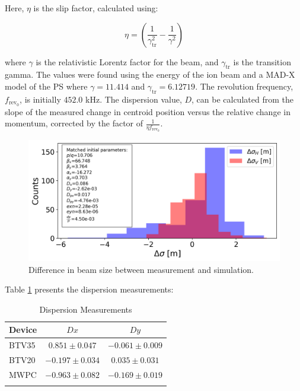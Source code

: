 \documentclass[a4paper,
               biblatex,     %
               ]{jacow}
\begin{document}
Here, $\eta$ is the slip factor, calculated using:

\begin{equation}
\eta = \left(\frac{1}{\gamma_{\text{tr}}^{2}} - \frac{1}{\gamma^{2}}\right)
\end{equation}

where $\gamma$ is the relativistic Lorentz factor for the beam, and $\gamma_{\text{tr}}$ is the transition gamma. The values were found using the energy of the ion beam and a MAD-X model of the PS where $\gamma = 11.414$ and $\gamma_{\text{tr}} = 6.12719$. The revolution frequency, $f_{\text{rev}_0}$, is initially $452.0$ kHz. The dispersion value, $D$, can be calculated from the slope of the measured change in centroid position versus the relative change in momentum, corrected by the factor of $\frac{1}{\eta f_{\text{rev}_0}}$.

\begin{figure}[!htb]
   \centering
   \includegraphics*[width=1.0\columnwidth]{beam_size_diff.png}
   \caption{Difference in beam size between measurement and simulation.}
   \label{fig:diff_beam_size}
\end{figure}

Table \ref{tab:dispersion} presents the dispersion measurements:

\begin{table}[h!]
\centering
\caption{Dispersion Measurements}
\begin{tabular}{l c c}
\hline
Device & \(Dx\) & \(Dy\) \\
\hline
BTV35  & \(0.851 \pm 0.047\) & \(-0.061 \pm 0.009\) \\
BTV20  & \(-0.197 \pm 0.034\) & \(0.035 \pm 0.031\) \\
MWPC   & \(-0.963 \pm 0.082\) & \(-0.169 \pm 0.019\) \\
\hline
\label{tab:dispersion}
\end{tabular}
\end{table}
\end{document}
